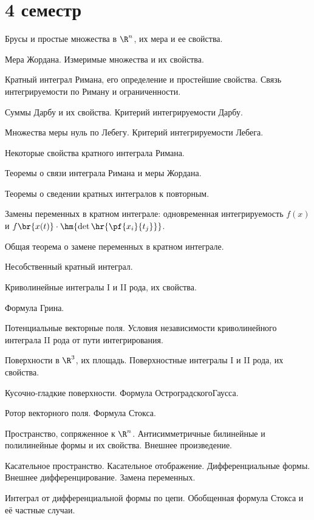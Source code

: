 \documentclass[a4paper]{article}
\begin{document}
\section*{4 семестр}

\begin{nums}{-2}
\item Брусы и простые множества в $\R^n$, их мера и ее свойства.
\item Мера Жордана. Измеримые множества и их свойства.
\item Кратный интеграл Римана, его определение и простейшие свойства. Связь интегрируемости по Риману и ограниченности.
\item Суммы Дарбу и их свойства. Критерий интегрируемости Дарбу.
\item Множества меры нуль по Лебегу. Критерий интегрируемости Лебега.
\item Некоторые свойства кратного интеграла Римана.
\item Теоремы о связи интеграла Римана и меры Жордана.
\item Теоремы о сведении кратных интегралов к повторным.
\item Замены переменных в кратном интеграле: одновременная интегрируемость
$f(x)$ и $f\br{x(t)} \cdot \hm{\det\hr{\pf{x_i}{t_j}}}$.
\item Общая теорема о замене переменных в кратном интеграле.
\item Несобственный кратный интеграл.
\item Криволинейные интегралы I и II рода, их свойства.
\item Формула Грина.
\item Потенциальные векторные поля. Условия независимости криволинейного интеграла II
рода от пути интегрирования.
\item Поверхности в $\R^3$, их площадь. Поверхностные интегралы I и II рода, их свойства.
\item Кусочно-гладкие поверхности. Формула Остроградского\ч Гаусса.
\item Ротор векторного поля. Формула Стокса.
\item Пространство, сопряженное к $\R^n$. Антисимметричные билинейные и полилинейные формы
и их свойства. Внешнее произведение.
\item Касательное пространство. Касательное отображение. Дифференциальные формы.
Внешнее дифференцирование. Замена переменных.
\item Интеграл от дифференциальной формы по цепи. Обобщенная формула Стокса и её
частные случаи.
\end{nums}

\medskip\dmvntrail
\end{document}
